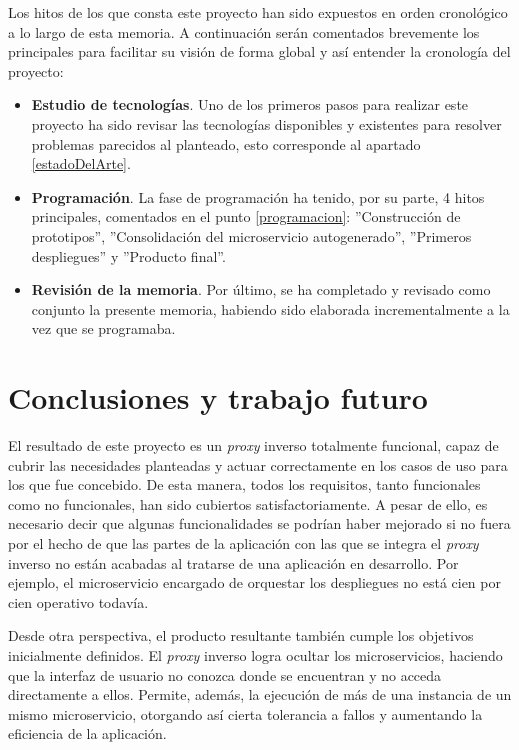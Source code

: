 \documentclass[11pt,spanish,listoffigures]{tfgetsinf}
\begin{document}
Los hitos de los que consta este proyecto han sido expuestos en orden cronológico a lo largo de esta memoria. A continuación serán comentados brevemente los principales para facilitar su visión de forma global y así entender la cronología del proyecto:

\begin{itemize}

	\item \textbf{Estudio de tecnologías}. Uno de los primeros pasos para realizar este proyecto ha sido revisar las tecnologías disponibles y existentes para resolver problemas parecidos al planteado, esto corresponde al apartado \ref{estadoDelArte}.

	\item \textbf{Programación}. La fase de programación ha tenido, por su parte, 4 hitos principales, comentados en el punto \ref{programacion}: ''Construcción de prototipos'', ''Consolidación del microservicio autogenerado'', ''Primeros despliegues'' y ''Producto final''.

	\item \textbf{Revisión de la memoria}. Por último, se ha completado y revisado como conjunto la presente memoria, habiendo sido elaborada incrementalmente a la vez que se programaba.

\end{itemize}


\chapter{Conclusiones y trabajo futuro}

El resultado de este proyecto es un \emph{proxy} inverso totalmente funcional, capaz de cubrir las necesidades planteadas y actuar correctamente en los casos de uso para los que fue concebido. De esta manera, todos los requisitos, tanto funcionales como no funcionales, han sido cubiertos satisfactoriamente. A pesar de ello, es necesario decir que algunas funcionalidades se podrían haber mejorado si no fuera por el hecho de que las partes de la aplicación con las que se integra el \emph{proxy} inverso no están acabadas al tratarse de una aplicación en desarrollo. Por ejemplo, el microservicio encargado de orquestar los despliegues no está cien por cien operativo todavía.

Desde otra perspectiva, el producto resultante también cumple los objetivos inicialmente definidos. El \emph{proxy} inverso logra ocultar los microservicios, haciendo que la interfaz de usuario no conozca donde se encuentran y no acceda directamente a ellos. Permite, además, la ejecución de más de una instancia de un mismo microservicio, otorgando así cierta tolerancia a fallos y aumentando la eficiencia de la aplicación.
\end{document}
